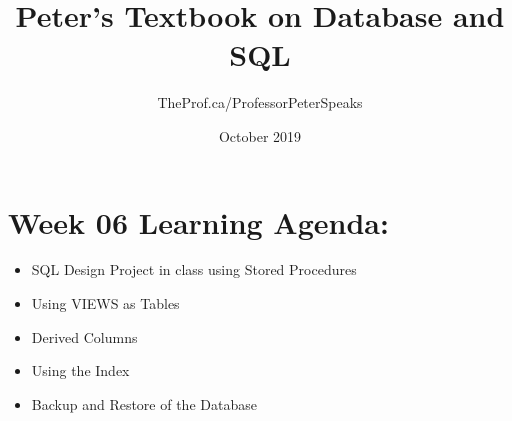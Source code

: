 \documentclass{article}
\title{Peter's Textbook on Database and SQL}
\author{TheProf.ca/ProfessorPeterSpeaks }
\date{October 2019}
\begin{document}
\maketitle
\tableofcontents



\section{Week 06 Learning Agenda:}

\begin{itemize}
    \item SQL Design Project in class using Stored Procedures
    \item Using VIEWS as Tables 
    \item Derived Columns
    \item Using the Index
    \item Backup and Restore of the Database
\end{itemize}    















\end{document}
